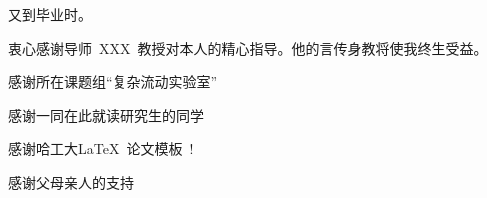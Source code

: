 \begin{acknowledgements}
又到毕业时。%

衷心感谢导师~XXX~教授对本人的精心指导。他的言传身教将使我终生受益。

感谢所在课题组“复杂流动实验室”

感谢一同在此就读研究生的同学

感谢哈工大\LaTeX\ 论文模板\hithesis\ !

感谢父母亲人的支持



\end{acknowledgements}
